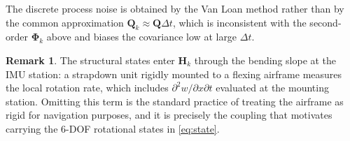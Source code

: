 \documentclass[11pt,a4paper]{article}
\theoremstyle{definition}
\newtheorem{remark}[theorem]{Remark}
\numberwithin{equation}{section}
\begin{document}
\begin{appendices}
The discrete process noise is obtained by the Van Loan method rather than by the common approximation $\mathbf{Q}_k \approx \mathbf{Q}\Delta t$, which is inconsistent with the second-order $\bm{\Phi}_k$ above and biases the covariance low at large $\Delta t$.

\begin{remark}
The structural states enter $\mathbf{H}_k$ through the bending slope at the IMU station: a strapdown unit rigidly mounted to a flexing airframe measures the local rotation rate, which includes $\partial^2 w / \partial x \partial t$ evaluated at the mounting station. Omitting this term is the standard practice of treating the airframe as rigid for navigation purposes, and it is precisely the coupling that motivates carrying the 6-DOF rotational states in \cref{eq:state}.
\end{remark}

\end{appendices}
\end{document}
